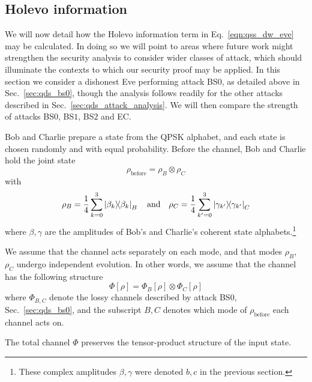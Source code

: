 


\subsection{Holevo information}

We will now detail how the Holevo information term in Eq.~\ref{eqn:qss_dw_eve} may be calculated. In doing so we will point to areas where future work might strengthen the security analysis to consider wider classes of attack, which should illuminate the contexts to which our security proof may be applied. In this section we consider a dishonest Eve performing attack BS$0$, as detailed above in Sec.~\ref{sec:qds_bs0}, though the analysis follows readily for the other attacks described in Sec.~\ref{sec:qds_attack_analysis}. We will then compare the strength of attacks BS$0$, BS$1$, BS$2$ and EC. %

Bob and Charlie prepare a state from the QPSK alphabet, and each state is chosen randomly and with equal probability. Before the channel, Bob and Charlie hold the joint state
\begin{equation}
\rho_{\text{before}} = \rho_B \otimes \rho_C
\end{equation}
with
\begin{equation}\label{eqn:qss_initial_states}
\rho_B = \frac{1}{4} \sum_{k=0}^3 \dyad{\beta_k}_B \qq{and} \rho_C = \frac{1}{4} \sum_{k^\prime = 0}^3 \dyad{\gamma_{k^\prime}}_C
\end{equation}
where $\beta, \gamma$ are the amplitudes of Bob's and Charlie's coherent state alphabets.\footnote{These complex amplitudes $\beta, \gamma$ were denoted $b, c$ in the previous section.}

We assume that the channel acts separately on each mode, and that modes $\rho_B$, $\rho_C$ undergo independent evolution. In other words, we assume that the channel has the following structure
\begin{equation}\label{eqn:qss_channel}
\Phi\left[\rho\right] = \Phi_B\left[\rho\right] \otimes \Phi_C\left[\rho\right]
\end{equation}
where $\Phi_{B, C}$ denote the lossy channels described by attack BS$0$, Sec.~\ref{sec:qds_bs0}, and the subscript $B, C$ denotes which mode of $\rho_{\text{before}}$ each channel acts on. 
\iffalse
\begin{align}
\Phi_B\left[\rho\right] = \varphi_B\left(\text{Tr}_C \rho\right) \otimes \mathds{1}_C\left(\text{Tr}_B\rho\right) \notag \\
\Phi_C\left[\rho\right] = \mathds{1}_B\left(\text{Tr}_C\rho\right) \otimes \varphi_C\left(\text{Tr}_B\rho\right)
\end{align}
with $\mathds{1}$ the identity channel and $\varphi_{B,C}$ denotes the lossy channels described by attack BS$0$, Sec.~\ref{sec:qds_bs0}. The Total 
\fi
The total channel $\Phi$ preserves the tensor-product structure of the input state.

